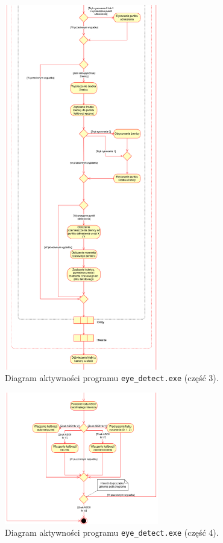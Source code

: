 \documentclass[a4paper,twoside,12pt]{book}
\begin{document}
\begin{figure}[htbp]
	\centering
	\includegraphics[width=0.6\textwidth]{pic/diagram aktywności/druga próba/diagram aktywności 3.png}
	\caption{Diagram aktywności programu \texttt{eye\-\_detect.exe} (część 3).}
	\label{fig:diagram-aktywnosci-3}
\end{figure}

\begin{figure}[htbp]
	\centering
	\includegraphics[width=0.6\textwidth]{pic/diagram aktywności/druga próba/diagram aktywności 4.png}
	\caption{Diagram aktywności programu \texttt{eye\-\_detect.exe} (część 4).}
	\label{fig:diagram-aktywnosci-4}
\end{figure}
\end{document}
